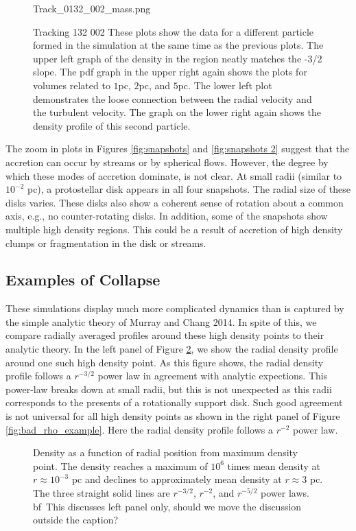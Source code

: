\documentclass{emulateapj}
\begin{document}
\begin{figure}
 {Track_0132_002_mass.png}
\caption{Tracking 132 002  These plots show the data for a different particle formed in the simulation at the same time as the previous plots.  The upper left graph of the density in the region neatly matches the -3/2 slope.  The pdf graph in the upper right again shows the plots for volumes related to $1$pc, $2$pc, and $5$pc.  The lower left plot demonstrates the loose connection between the radial velocity and the turbulent velocity.  The graph on the lower right again shows the density profile of this second particle.     \label{fig:132_002_graphs}}
\end{figure}


The zoom in plots in Figures \ref{fig:snapshots} and \ref{fig:snapshots 2} suggest that the accretion can occur by streams or by spherical flows.  However, the degree by which these modes of accretion dominate, is not clear.  At small radii (similar to $10^{-2}$ pc), a protostellar disk appears in all four snapshots. The radial size of these disks varies. These disks also show a coherent sense of rotation about a common axis, e.g., no counter-rotating disks. In addition, some of the snapshots show multiple high density regions.  This could be a result of accretion of high density clumps or fragmentation in the disk or streams.  
 


\subsection{Examples of Collapse}

These simulations display much more complicated dynamics than is captured by the simple analytic theory of Murray and Chang 2014.  In spite of this, we compare radially averaged profiles around these high density points to their analytic theory.  In the left panel of Figure \ref{fig:good_rho_example}, we show the radial density profile around one such high density point. As this figure shows, the radial density profile follows a $r^{-3/2}$ power law in agreement with analytic expections.  This power-law breaks down at small radii, but this is not unexpected as this radii corresponds to the presents of a rotationally support disk.  Such good agreement is not universal for all high density points as shown in the right panel of Figure \ref{fig:bad_rho_example}.  Here the radial density profile follows a $r^{-2}$ power law.  
\begin{figure}
\caption{Density as a function of radial position from maximum density point.  The density reaches a maximum of $10^6$ times mean density at $r \approx 10^{-3}$ pc and declines to approximately mean density at $r\approx 3$ pc.  The three straight solid lines are $r^{-3/2}$, $r^{-2}$, and $r^{-5/2}$ power laws. \label{fig:good_rho_example}
{bf\ This discusses left panel only, should we move the discussion outside the caption?}}
\end{figure}
\end{document}
